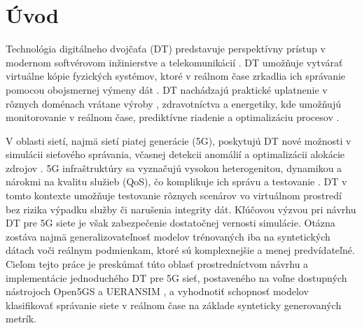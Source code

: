 \thispagestyle{empty}
\chapter{Úvod}

Technológia digitálneho dvojčaťa (DT) predstavuje perspektívny prístup v modernom softvérovom inžinierstve \cite{DimensionOfDTAplication} a telekomunikácií \cite{AplicationsOfDT}. DT umožňuje vytvárať virtuálne kópie fyzických systémov, ktoré v reálnom čase zrkadlia ich správanie pomocou obojsmernej výmeny dát \cite{real_time}. DT nachádzajú praktické uplatnenie v rôznych doménach vrátane výroby \cite{manufacturing}, zdravotníctva \cite{siemens_helthcare} a energetiky, kde umožňujú monitorovanie v reálnom čase, prediktívne riadenie a optimalizáciu procesov \cite{AplicationsOfDT}.

V oblasti sietí, najmä sietí piatej generácie (5G), poskytujú DT nové možnosti v simulácii sieťového správania, včasnej detekcii anomálií a optimalizácii alokácie zdrojov \cite{5gandbeyond}. 5G infraštruktúry sa vyznačujú vysokou heterogenitou, dynamikou a nárokmi na kvalitu služieb (QoS), čo komplikuje ich správu a testovanie \cite{AplicationsOfDT}. DT v tomto kontexte umožňuje testovanie rôznych scenárov vo virtuálnom prostredí bez rizika výpadku služby či narušenia integrity dát. Kľúčovou výzvou pri návrhu DT pre 5G siete je však zabezpečenie dostatočnej vernosti simulácie. Otázna zostáva najmä generalizovateľnosť modelov trénovaných iba na syntetických dátach voči reálnym podmienkam, ktoré sú komplexnejšie a menej predvídateľné. Cieľom tejto práce je preskúmať túto oblasť prostredníctvom návrhu a implementácie jednoduchého DT pre 5G sieť, postaveného na voľne dostupných nástrojoch Open5GS \cite{open5gs} a UERANSIM \cite{ueransim}, a vyhodnotiť schopnosť modelov klasifikovať správanie siete v reálnom čase na základe synteticky generovaných metrík.
